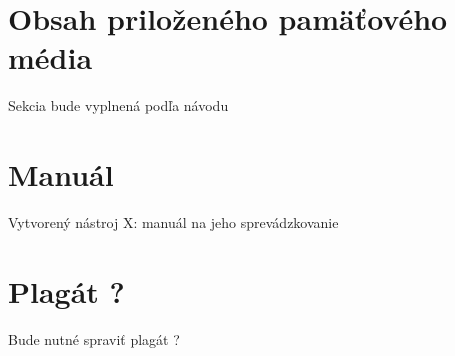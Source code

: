 \chapter{Obsah priloženého pamäťového média}

Sekcia bude vyplnená podľa návodu 

\chapter{Manuál}

Vytvorený nástroj X: manuál na jeho sprevádzkovanie

\chapter{Plagát ?}

Bude nutné spraviť plagát ?
